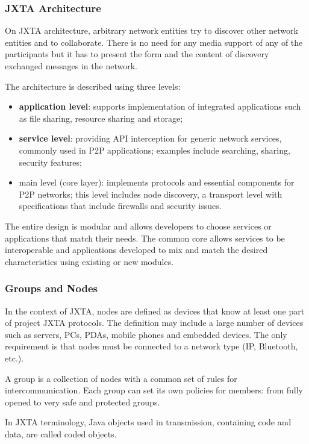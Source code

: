 \subsubsection{JXTA Architecture}

On JXTA architecture, arbitrary network entities try to discover other network
entities and to collaborate. There is no need for any media support
of any of the participants but it has to present the form and the content of
discovery exchanged messages in the network.

The architecture is described using three levels:

\begin{itemize}
  \item \textbf{application level}: supports implementation of integrated
  applications such as file sharing, resource sharing and storage;
  \item \textbf{service level}: providing API interception for generic network
  services, commonly used in P2P applications; examples include searching,
  sharing, security features;
  \item main level (core layer): implements protocols and essential components
  for P2P networks; this level includes node discovery, a transport level with
  specifications that include firewalls and security issues.
\end{itemize}

The entire design is modular and allows developers to choose services or
applications that match their needs. The common core allows services to be
interoperable and applications developed to mix and match the desired
characteristics using existing or new modules.

\subsubsection{Groups and Nodes}

In the context of JXTA, nodes are defined as devices that know at least one
part of project JXTA protocols. The definition may include a large number of
devices such as servers, PCs, PDAs, mobile phones and embedded devices. The
only requirement is that nodes must be connected to a network type (IP,
Bluetooth, etc.).

A group is a collection of nodes with a common set of rules for
intercommunication. Each group can set its own policies for members: from
fully opened to very safe and protected groups.

In JXTA terminology, Java objects used in transmission, containing code and
data, are called coded objects.

